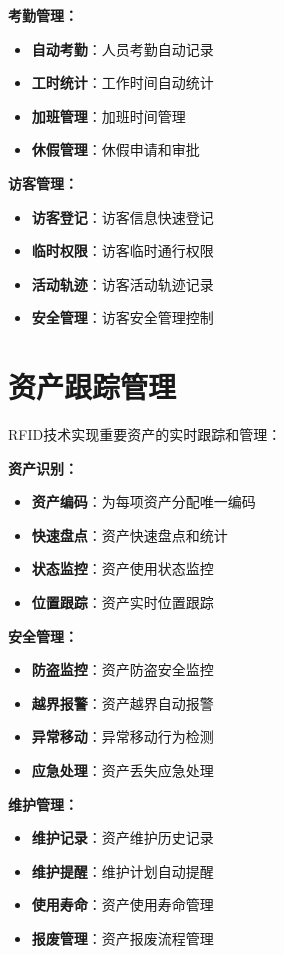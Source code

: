 \documentclass[12pt,UTF8]{ctexbook}
\begin{document}
\begin{itemize}[leftmargin=3.5em]
\begin{itemize}[leftmargin=3.5em]
\begin{itemize}[leftmargin=3.5em]
\begin{itemize}[leftmargin=3.5em]
\textbf{考勤管理：}
\begin{itemize}[leftmargin=3.5em]
    \item \textbf{自动考勤}：人员考勤自动记录
    \item \textbf{工时统计}：工作时间自动统计
    \item \textbf{加班管理}：加班时间管理
    \item \textbf{休假管理}：休假申请和审批
\end{itemize}

\textbf{访客管理：}
\begin{itemize}[leftmargin=3.5em]
    \item \textbf{访客登记}：访客信息快速登记
    \item \textbf{临时权限}：访客临时通行权限
    \item \textbf{活动轨迹}：访客活动轨迹记录
    \item \textbf{安全管理}：访客安全管理控制
\end{itemize}

\section{资产跟踪管理}

RFID技术实现重要资产的实时跟踪和管理：

\textbf{资产识别：}
\begin{itemize}[leftmargin=3.5em]
    \item \textbf{资产编码}：为每项资产分配唯一编码
    \item \textbf{快速盘点}：资产快速盘点和统计
    \item \textbf{状态监控}：资产使用状态监控
    \item \textbf{位置跟踪}：资产实时位置跟踪
\end{itemize}

\textbf{安全管理：}
\begin{itemize}[leftmargin=3.5em]
    \item \textbf{防盗监控}：资产防盗安全监控
    \item \textbf{越界报警}：资产越界自动报警
    \item \textbf{异常移动}：异常移动行为检测
    \item \textbf{应急处理}：资产丢失应急处理
\end{itemize}

\textbf{维护管理：}
\begin{itemize}[leftmargin=3.5em]
    \item \textbf{维护记录}：资产维护历史记录
    \item \textbf{维护提醒}：维护计划自动提醒
    \item \textbf{使用寿命}：资产使用寿命管理
    \item \textbf{报废管理}：资产报废流程管理
\end{itemize}


\end{itemize}
\end{itemize}
\end{itemize}
\end{itemize}
\end{document}
